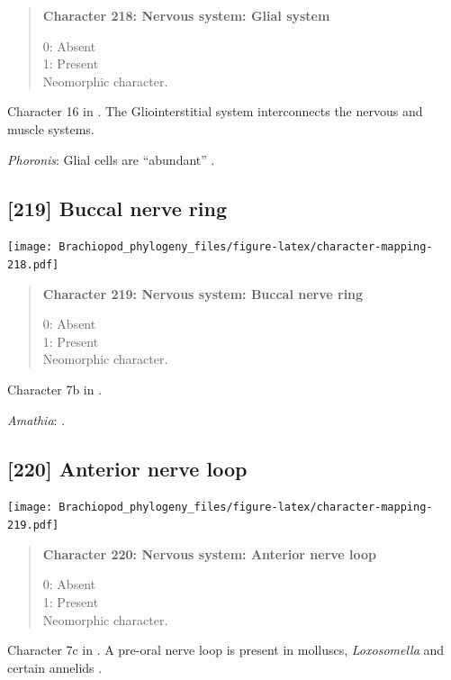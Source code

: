 \documentclass[openany]{book}
\begin{document}
\begin{quote}
\textbf{Character 218: Nervous system: Glial system}

0: Absent\\
1: Present\\
Neomorphic character.
\end{quote}

Character 16 in \citet{Haszprunar1996}. The Gliointerstitial system
interconnects the nervous and muscle systems.

\hypertarget{Phoronis-coding-218}{}
\emph{Phoronis}: Glial cells are ``abundant''
\citep{Temereva2016Phoronida}.

\subsection*{{[}219{]} Buccal nerve ring}\label{buccal-nerve-ring}

\texttt{[image: Brachiopod\_phylogeny\_files/figure-latex/character-mapping-218.pdf]}

\begin{quote}
\textbf{Character 219: Nervous system: Buccal nerve ring}

0: Absent\\
1: Present\\
Neomorphic character.
\end{quote}

Character 7b in \citet{Haszprunar2008}.

\hypertarget{Amathia-coding-219}{}
\emph{Amathia}: \citet{Temereva2016Thenervous}.

\subsection*{{[}220{]} Anterior nerve loop}\label{anterior-nerve-loop}

\texttt{[image: Brachiopod\_phylogeny\_files/figure-latex/character-mapping-219.pdf]}

\begin{quote}
\textbf{Character 220: Nervous system: Anterior nerve loop}

0: Absent\\
1: Present\\
Neomorphic character.
\end{quote}

Character 7c in \citet{Haszprunar2008}. A pre-oral nerve loop is present
in molluscs, \emph{Loxosomella} and certain annelids
\citep{Wanninger2007}.
\end{document}
